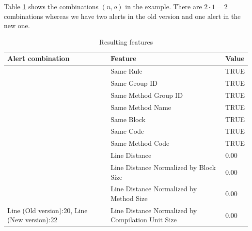 \documentclass[
]{article}
\begin{document}
Table \ref{table_features} shows the combinations \((n,o)\) in the
example. There are \(2 \cdot 1 = 2\) combinations whereas we have two
alerts in the old version and one alert in the new one.

\small

\begin{table}[!h]

\caption{\label{tab:unnamed-chunk-11}Resulting features\label{table_features} }
\centering
\begin{tabular}[t]{l|l|l}
\hline
Alert combination & Feature & Value\\
\hline
\rowcolor{gray!6}   & Same Rule & TRUE\\

 & Same Group ID & TRUE\\

\rowcolor{gray!6}   & Same Method Group ID & TRUE\\

 & Same Method Name & TRUE\\

\rowcolor{gray!6}   & Same Block & TRUE\\

 & Same Code & TRUE\\

\rowcolor{gray!6}   & Same Method Code & TRUE\\

 & Line Distance & 0.00\\

\rowcolor{gray!6}   & Line Distance Normalized by Block Size & 0.00\\

 & Line Distance Normalized by Method Size & 0.00\\

\multirow[t]{-11}{*}{\raggedright\arraybackslash Line (Old version):20, Line (New version):22} & Line Distance Normalized by Compilation Unit Size & 0.00\\
\hline
\end{tabular}
\end{table}

\normalsize

\small

\normalsize

\newpage
\end{document}
